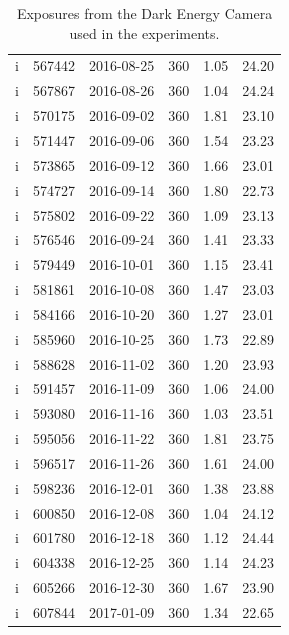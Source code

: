 \documentclass[letterpaper,preprint]{aastex62}
\begin{document}
\begin{table}
\begin{center}
\begin{tabular}{cccccc}
      i & 567442 & 2016-08-25 & 360 & 1.05 & 24.20 \\
      i & 567867 & 2016-08-26 & 360 & 1.04 & 24.24 \\
      i & 570175 & 2016-09-02 & 360 & 1.81 & 23.10 \\
      i & 571447 & 2016-09-06 & 360 & 1.54 & 23.23 \\
      i & 573865 & 2016-09-12 & 360 & 1.66 & 23.01 \\
      i & 574727 & 2016-09-14 & 360 & 1.80 & 22.73 \\
      i & 575802 & 2016-09-22 & 360 & 1.09 & 23.13 \\
      i & 576546 & 2016-09-24 & 360 & 1.41 & 23.33 \\
      i & 579449 & 2016-10-01 & 360 & 1.15 & 23.41 \\
      i & 581861 & 2016-10-08 & 360 & 1.47 & 23.03 \\
      i & 584166 & 2016-10-20 & 360 & 1.27 & 23.01 \\
      i & 585960 & 2016-10-25 & 360 & 1.73 & 22.89 \\
      i & 588628 & 2016-11-02 & 360 & 1.20 & 23.93 \\
      i & 591457 & 2016-11-09 & 360 & 1.06 & 24.00 \\
      i & 593080 & 2016-11-16 & 360 & 1.03 & 23.51 \\
      i & 595056 & 2016-11-22 & 360 & 1.81 & 23.75 \\
      i & 596517 & 2016-11-26 & 360 & 1.61 & 24.00 \\
      i & 598236 & 2016-12-01 & 360 & 1.38 & 23.88 \\
      i & 600850 & 2016-12-08 & 360 & 1.04 & 24.12 \\
      i & 601780 & 2016-12-18 & 360 & 1.12 & 24.44 \\
      i & 604338 & 2016-12-25 & 360 & 1.14 & 24.23 \\
      i & 605266 & 2016-12-30 & 360 & 1.67 & 23.90 \\
      i & 607844 & 2017-01-09 & 360 & 1.34 & 22.65 \\
    \end{tabular}
    \caption{Exposures from the Dark Energy Camera used in the
      experiments.\label{tab:exposures}}
  \end{center}
\end{table}
\end{document}
